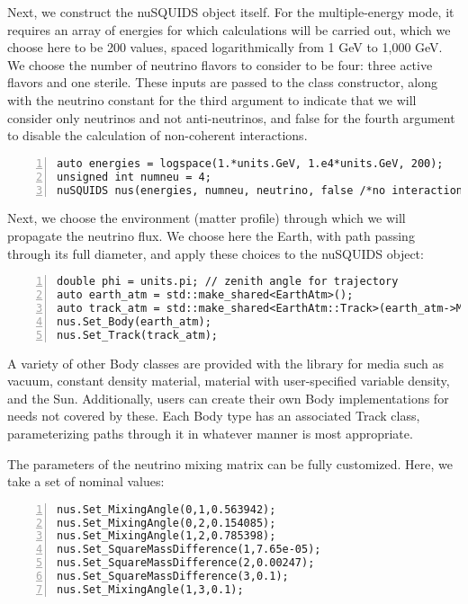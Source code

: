 \documentclass[3p,12pt]{elsarticle}
\newcommand{\ttf}{\ttfamily}
\begin{document}
Next, we construct the {\ttf nuSQUIDS} object itself. 
For the multiple-energy mode, it requires an array of energies for which calculations will be carried out, which we choose here to be 200 values, spaced logarithmically from 1 GeV to 1,000 GeV. 
We choose the number of neutrino flavors to consider to be four: three active flavors and one sterile. 
These inputs are passed to the class constructor, along with the {\ttf neutrino} constant for the third argument to indicate that we will consider only neutrinos and not anti-neutrinos, and {\ttf false} for the fourth argument to disable the calculation of non-coherent interactions. 
\begin{lstlisting}[frame=leftline, numbers = left,breaklines=true,firstnumber=last]
auto energies = logspace(1.*units.GeV, 1.e4*units.GeV, 200);
unsigned int numneu = 4;
nuSQUIDS nus(energies, numneu, neutrino, false /*no interactions*/);
\end{lstlisting}

Next, we choose the environment (matter profile) through which we will propagate the neutrino flux. 
We choose here the Earth, with path passing through its full diameter, and apply these choices to the {\ttf nuSQUIDS} object:
\begin{lstlisting}[frame=leftline, numbers = left,breaklines=true,firstnumber=last]
double phi = units.pi; // zenith angle for trajectory
auto earth_atm = std::make_shared<EarthAtm>();
auto track_atm = std::make_shared<EarthAtm::Track>(earth_atm->MakeTrack(phi));
nus.Set_Body(earth_atm);
nus.Set_Track(track_atm);
\end{lstlisting}

A variety of other {\ttf Body} classes are provided with the library for media such as vacuum, constant density material, material with user-specified variable density, and the Sun. 
Additionally, users can create their own {\ttf Body} implementations for needs not covered by these. 
Each {\ttf Body} type has an associated {\ttf Track} class, parameterizing paths through it in whatever manner is most appropriate. 

The parameters of the neutrino mixing matrix can be fully customized. 
Here, we take a set of nominal values:

\begin{lstlisting}[frame=leftline, numbers = left,breaklines=true,firstnumber=last]
nus.Set_MixingAngle(0,1,0.563942);
nus.Set_MixingAngle(0,2,0.154085);
nus.Set_MixingAngle(1,2,0.785398);
nus.Set_SquareMassDifference(1,7.65e-05);
nus.Set_SquareMassDifference(2,0.00247);
nus.Set_SquareMassDifference(3,0.1);
nus.Set_MixingAngle(1,3,0.1);
\end{lstlisting}
\end{document}
